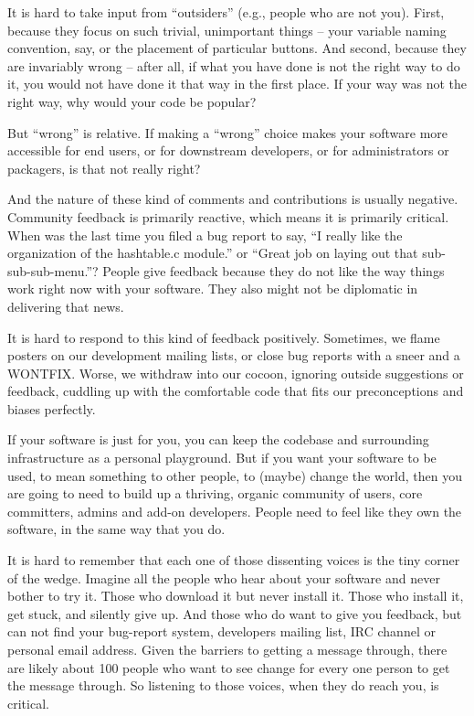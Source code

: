 It is hard to take input from ``outsiders'' (e.g., people who are not you). First, because they focus on such trivial, unimportant things -- your variable naming convention, say, or the placement of particular buttons. And second, because they are invariably wrong -- after all, if what you have done is not the right way to do it, you would not have done it that way in the first place. If your way was not the right way, why would your code be popular?

But ``wrong'' is relative. If making a ``wrong'' choice makes your software more
accessible for end users, or for downstream developers, or for administrators or
packagers, is that not really right?

And the nature of these kind of comments and contributions is usually negative.
Community feedback is primarily reactive, which means it is primarily critical.
When was the last time you filed a bug report to say, ``I really like the
organization of the hashtable.c module.'' or ``Great job on laying out that
sub-sub-sub-menu.''? People give feedback because they do not like the way things work right now with your software. They also might not be diplomatic in
delivering that news.

It is hard to respond to this kind of feedback positively. Sometimes, we flame
posters on our development mailing lists, or close bug reports with a sneer and
a WONTFIX. Worse, we withdraw into our cocoon, ignoring outside suggestions or
feedback, cuddling up with the comfortable code that fits our preconceptions and
biases perfectly.

If your software is just for you, you can keep the codebase and surrounding
infrastructure as a personal playground. But if you want your software to be
used, to mean something to other people, to (maybe) change the world, then
you are going to need to build up a thriving, organic community of users, core
committers, admins and add-on developers. People need to feel like they own the
software, in the same way that you do.

It is hard to remember that each one of those dissenting voices is the tiny
corner of the wedge. Imagine all the people who hear about your software and
never bother to try it. Those who download it but never install it. Those who
install it, get stuck, and silently give up. And those who do want to give you
feedback, but can not find your bug-report system, developers mailing list, IRC
channel or personal email address. Given the barriers to getting a message
through, there are likely about 100 people who want to see change for
every one person to get the message through. So listening to those voices, when
they do reach you, is critical.


